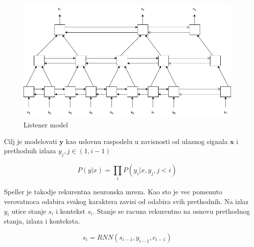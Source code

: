 \documentclass[a4paper]{article}
\begin{document}
\begin{figure}[h!]
  \begin{center}
    \includegraphics[scale=0.3]{listener.png}
  \end{center}
  \caption{Listener model}
  \label{fig:listener_model}
\end{figure}

\bigskip
Cilj je modelovati $\textbf{y}$ kao uslovnu raspodelu u zavisnosti od ulaznog signala $\textbf{x}$ i prethodnih izlaza $y_j,  j \in (1,  i-1)$

\begin{equation}
\label{eq:chain}
P(y | x) = \prod_i P(y_i | x,  y_j,  j < i)
\end{equation}

\bigskip

Speller je takodje rekurentna neuronska mreza.  Kao sto je vec pomenuto verovatnoca odabira svakog karaktera zavisi od odabira svih prethodnih.  Na izlaz $y_i$ utice stanje $s_i$ i kontekst $s_i$.  Stanje se racuna rekurentno na osnovu prethodnog stanja,  izlaza i konteksta.

 \begin{equation}
\label{eq:state}
s_i = RNN (s_{i-1},  y_{i-1},  c_{i-1})
\end{equation}
\end{document}
